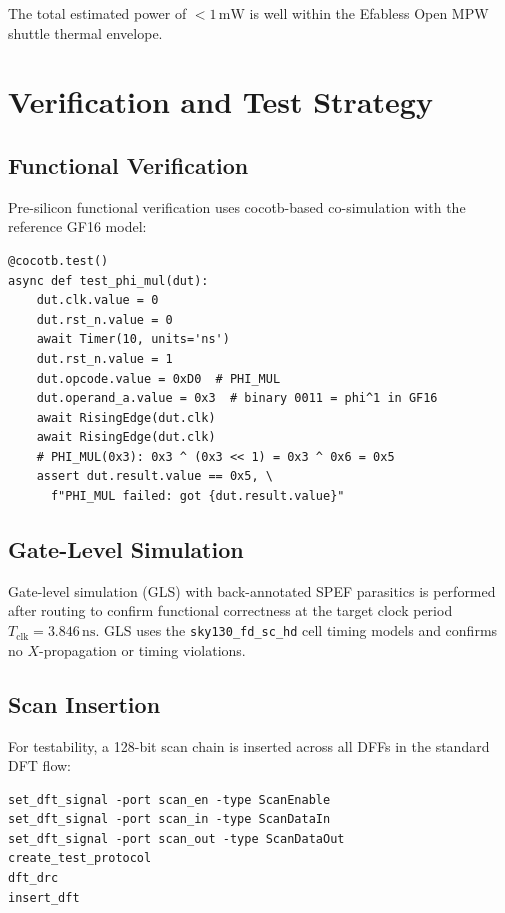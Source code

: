 \noindent
The total estimated power of $< 1\,\mathrm{mW}$ is well within the
Efabless Open MPW shuttle thermal envelope.

\section{Verification and Test Strategy}
\label{sec:72:verification}

\subsection{Functional Verification}
\label{subsec:72:functional-verification}

Pre-silicon functional verification uses cocotb-based co-simulation
with the reference GF16 model:

\begin{verbatim}
@cocotb.test()
async def test_phi_mul(dut):
    dut.clk.value = 0
    dut.rst_n.value = 0
    await Timer(10, units='ns')
    dut.rst_n.value = 1
    dut.opcode.value = 0xD0  # PHI_MUL
    dut.operand_a.value = 0x3  # binary 0011 = phi^1 in GF16
    await RisingEdge(dut.clk)
    await RisingEdge(dut.clk)
    # PHI_MUL(0x3): 0x3 ^ (0x3 << 1) = 0x3 ^ 0x6 = 0x5
    assert dut.result.value == 0x5, \
      f"PHI_MUL failed: got {dut.result.value}"
\end{verbatim}

\subsection{Gate-Level Simulation}
\label{subsec:72:gls}

Gate-level simulation (GLS) with back-annotated SPEF parasitics
is performed after routing to confirm functional correctness
at the target clock period $T_{\text{clk}} = 3.846\,\mathrm{ns}$.
GLS uses the \texttt{sky130\_fd\_sc\_hd} cell timing models and confirms
no $X$-propagation or timing violations.

\subsection{Scan Insertion}
\label{subsec:72:scan}

For testability, a 128-bit scan chain is inserted across all DFFs
in the standard DFT flow:

\begin{verbatim}
set_dft_signal -port scan_en -type ScanEnable
set_dft_signal -port scan_in -type ScanDataIn
set_dft_signal -port scan_out -type ScanDataOut
create_test_protocol
dft_drc
insert_dft
\end{verbatim}

